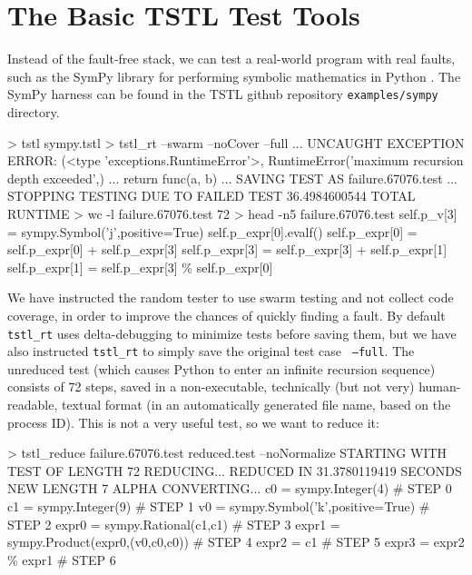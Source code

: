 \section{The Basic TSTL Test Tools}

Instead of the fault-free stack, we can test a real-world program with real faults, such as the SymPy library for performing symbolic mathematics in Python \cite{SymPy}.  The SymPy harness can be found in the TSTL github repository {\tt examples/sympy} directory.

{\scriptsize
\begin{code}
 > tstl sympy.tstl
 > tstl\_rt --swarm --noCover --full
...
 UNCAUGHT EXCEPTION
 ERROR: (<type 'exceptions.RuntimeError'>,
 RuntimeError('maximum recursion depth exceeded',)
...
    return func(a, b)
...
 SAVING TEST AS failure.67076.test
...
 STOPPING TESTING DUE TO FAILED TEST
 36.4984600544 TOTAL RUNTIME
 > wc -l failure.67076.test
 72
 > head -n5 failure.67076.test
 self.p\_v[3] = sympy.Symbol('j',positive=True) 
 self.p\_expr[0].evalf() 
 self.p\_expr[0] = self.p\_expr[0] + self.p\_expr[3] 
 self.p\_expr[3] = self.p\_expr[3] + self.p\_expr[1] 
 self.p\_expr[1] = self.p\_expr[3] \% self.p\_expr[0] 

\end{code}
}

We have instructed the random tester to use swarm testing
\cite{ISSTA12} and not collect code coverage, in order to improve the
chances of quickly finding a fault.  By default {\tt tstl\_rt} uses
delta-debugging to minimize tests before saving them, but we have
also instructed {\tt tstl\_rt} to simply save the original test case {\tt
  --full}.  The unreduced test (which causes Python to enter an
infinite recursion sequence) consists of 72 steps, saved in a
non-executable, technically (but not very) human-readable, textual
format (in an automatically generated file name, based on the process ID).  This is not a very useful test, so we want to reduce
it:

{\scriptsize
\begin{code}
 > tstl\_reduce failure.67076.test reduced.test --noNormalize
 STARTING WITH TEST OF LENGTH 72
 REDUCING...
 REDUCED IN 31.3780119419 SECONDS
 NEW LENGTH 7
 ALPHA CONVERTING...
 c0 = sympy.Integer(4)                            \# STEP 0
 c1 = sympy.Integer(9)                            \# STEP 1
 v0 = sympy.Symbol('k',positive=True)             \# STEP 2
 expr0 = sympy.Rational(c1,c1)                    \# STEP 3
 expr1 = sympy.Product(expr0,(v0,c0,c0))          \# STEP 4
 expr2 = c1                                       \# STEP 5
 expr3 = expr2 \% expr1                            \# STEP 6
\end{code}
}

